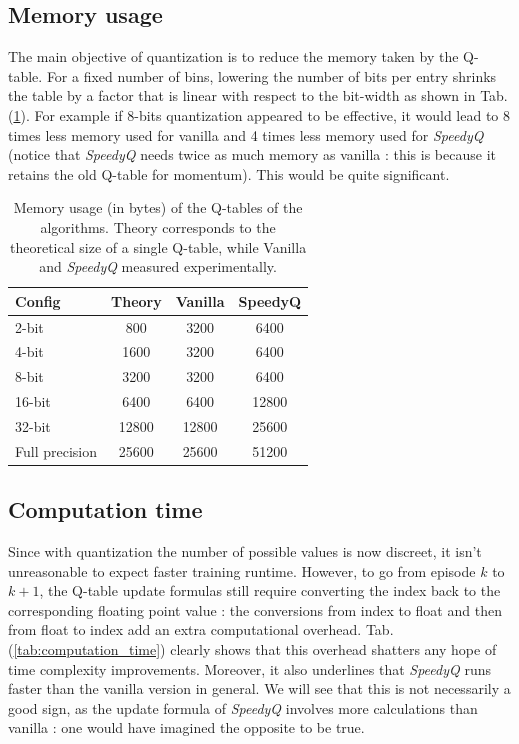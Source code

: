 \documentclass[10pt,conference,compsocconf]{IEEEtran}
\begin{document}
        \subsection{Memory usage}

        The main objective of quantization is to reduce the memory taken by the Q-table. For a fixed number of bins, lowering the number of bits per entry shrinks the table by a factor that is linear with respect to the bit-width as shown in Tab. (\ref{tab:mem_usage}). For example if 8-bits quantization appeared to be effective, it would lead to 8 times less memory used for vanilla and 4 times less memory used for \textit{SpeedyQ} (notice that \textit{SpeedyQ} needs twice as much memory as vanilla : this is because it retains the old Q-table for momentum). This would be quite significant.

        \begin{table}[]
        \centering
        \begin{tabular}{|l|c|c|c|}
        \hline
        \textbf{Config} & \textbf{Theory} & \textbf{Vanilla} & \textbf{SpeedyQ} \\ \hline
        2-bit           & 800             & 3200             & 6400             \\
        4-bit           & 1600            & 3200             & 6400             \\
        8-bit           & 3200            & 3200             & 6400             \\
        16-bit          & 6400            & 6400             & 12800            \\
        32-bit          & 12800           & 12800            & 25600            \\ 
        Full precision  & 25600           & 25600            & 51200            \\ \hline
        \end{tabular}
        \caption{Memory usage (in bytes) of the Q-tables of the algorithms. Theory corresponds to the theoretical size of a single Q-table, while Vanilla and \textit{SpeedyQ} measured experimentally.}
        \label{tab:mem_usage}
        \end{table}

        \subsection{Computation time}

        Since with quantization the number of possible values is now discreet, it isn't unreasonable to expect faster training runtime. However, to go from episode $k$ to $k+1$, the Q-table update formulas still require converting the index back to the corresponding floating point value : the conversions from index to float and then from float to index add an extra computational overhead. Tab. (\ref{tab:computation_time}) clearly shows that this overhead shatters any hope of time complexity improvements. Moreover, it also underlines that \textit{SpeedyQ} runs faster than the vanilla version in general. We will see that this is not necessarily a good sign, as the update formula of \textit{SpeedyQ} involves more calculations than vanilla : one would have imagined the opposite to be true.
\end{document}
